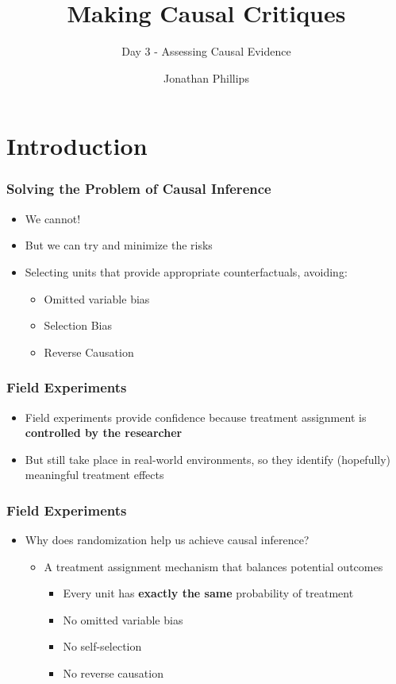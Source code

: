 \documentclass[xcolor=x11names,compress]{beamer}\usepackage[]{graphicx}\usepackage[]{color}
\title{Making Causal Critiques}
\subtitle{Day 3 - Assessing Causal Evidence}
\author{Jonathan Phillips}
\renewcommand{\(}{\begin{columns}}
\renewcommand{\)}{\end{columns}}
\newcommand{\<}[1]{\begin{column}{#1}}
\renewcommand{\>}{\end{column}}
\begin{document}
\frame{\titlepage}

\section{Introduction}

\begin{frame}
\frametitle{Solving the Problem of Causal Inference}
\begin{itemize}
\item We cannot!
\item But we can try and minimize the risks
\item Selecting units that provide appropriate counterfactuals, avoiding:
\begin{itemize}
\item Omitted variable bias
\item Selection Bias
\item Reverse Causation
\end{itemize}
\end{itemize}
\end{frame}

\begin{frame} 
\frametitle{Field Experiments}
\begin{itemize}
\item Field experiments provide confidence because treatment assignment is \textbf{controlled by the researcher}
\item But still take place in real-world environments, so they identify (hopefully) meaningful treatment effects
\end{itemize}
\end{frame}

\begin{frame}
\frametitle{Field Experiments}
\begin{itemize}
\item Why does randomization help us achieve causal inference?
\pause
\begin{itemize}
\item A treatment assignment mechanism that balances potential outcomes
\begin{itemize}
\item Every unit has \textbf{exactly the same} probability of treatment
\item No omitted variable bias
\item No self-selection
\item No reverse causation
\end{itemize}
\end{itemize}
\end{itemize}
\end{frame}
\end{document}

